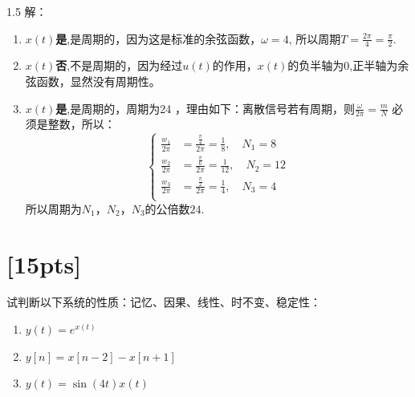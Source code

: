 \documentclass[a4paper,UTF8]{article}
\numberwithin{equation}{section}
\begin{document}
\begin{framed}
    \begin{spacing}{1.5}
    	解：
        \begin{enumerate}[(1)]
            \item $x(t)$\textbf{是},是周期的，因为这是标准的余弦函数，$\omega = 4$, 所以周期$T = \frac{2\pi}{4} = \frac{\pi}{2}$.
            \item $x(t)$\textbf{否},不是周期的，因为经过$u(t)$的作用，$x(t)$的负半轴为$0$,正半轴为余弦函数，显然没有周期性。
            \item $x(t)$\textbf{是},是周期的，周期为24 ，理由如下：离散信号若有周期，则$\frac{\omega}{2\pi} = \frac{m}{N}$ 必须是整数，所以：
            \[
            \left\{
            \begin{aligned}
            	\frac{w_1}{2\pi} &= \frac{\frac{\pi}{4}}{2\pi} = \frac{1}{8},\quad N_1 = 8\\
            	\frac{w_2}{2\pi} &= \frac{\frac{\pi}{6}}{2\pi} = \frac{1}{12},\quad N_2 = 12\\
            	\frac{w_3}{2\pi} &= \frac{\frac{\pi}{2}}{2\pi} = \frac{1}{4},\quad N_3 = 4\\
            \end{aligned}
            \right.
            \]
            所以周期为$N_1，N_2，N_3$的公倍数$24$.
        \end{enumerate}
    \end{spacing}
\end{framed}




\newpage
\section{[15pts]}
试判断以下系统的性质：记忆、因果、线性、时不变、稳定性：
\begin{enumerate}[(1)]
    \item $y(t) = e^{x(t)}$
    \item $y[n] = x[n-2] - x[n+1]$
    \item $y(t) = \sin(4t)x(t)$
\end{enumerate}
\end{document}
